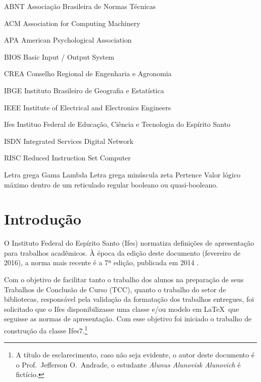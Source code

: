 \documentclass[times,english,brazil,oneside]{ifes7}
\newcommand{\ifestex}{\textsf{Ifes$7$}}
\begin{document}
\begin{siglas}
\item[ABNT] Associação Brasileira de Normas Técnicas
\item[ACM] Association for Computing Machinery
\item[APA] American Psychological Association
\item[BIOS] Basic Input / Output System
\item[CREA] Conselho Regional de Engenharia e Agronomia
\item[IBGE] Instituto Brasileiro de Geografia e Estatística
\item[IEEE] Institute of Electrical and Electronics Engineers
\item[Ifes] Instituo Federal de Educação, Ciência e Tecnologia do
  Espírito Santo
\item[ISDN] Integrated Services Digital Network
\item[RISC] Reduced Instruction Set Computer
\end{siglas}


\begin{simbolos}
\simb{$\Gamma$} Letra grega Gama
\simb{$\Lambda$} Lambda
\simb{$\zeta$} Letra grega minúscula zeta
\simb{$\in$} Pertence
\simb{$\top$} Valor lógico máximo dentro de um reticulado regular
  booleano ou quasi-booleano.
\end{simbolos}
\cleardoublepage


\tableofcontents*
\cleardoublepage


\textual


\setlength{\afterchapskip}{1.5cm minus \baselineskip}


\chapter{Introdução}
\label{cha:introducao}

O Instituto Federal do Espírito Santo (Ifes) normatiza definições de
apresentação para trabalhos acadêmicos. À época da edição deste
documento (fevereiro de 2016), a norma mais recente é a 7ª edição,
publicada em 2014 \cite{Ifes2014}.

Com o objetivo de facilitar tanto o trabalho dos alunos na preparação
de seus Trabalhos de Conclusão de Curso (TCC), quanto o trabalho do
setor de bibliotecas, responsável pela validação da formatação dos
trabalhos entregues, foi solicitado que o Ifes disponibilizasse uma
classe e/ou modelo em \LaTeX\ que seguisse as normas de
apresentação. Com esse objetivo foi iniciado o trabalho de construção
da classe \ifestex.\footnote{A título de esclarecimento, caso não seja
  evidente, o autor deste documento é o Prof.\ Jefferson O.\ Andrade,
  o estudante \emph{Alunus Alunovisk Alunovich} é fictício.}
\end{document}
